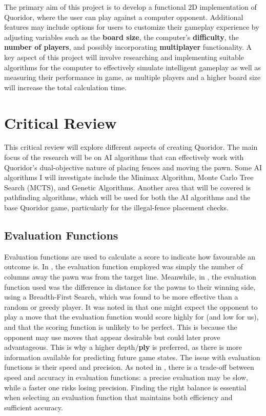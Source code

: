 \documentclass[review]{cmpreport}
\begin{document}
\noindent The primary aim of this project is to develop a functional 2D implementation of Quoridor, where the user can play against a computer opponent. Additional features may include options for users to customize their gameplay experience by adjusting variables such as the \textbf{board size}, the computer's \textbf{difficulty}, the \textbf{number of players}, and possibly incorporating \textbf{multiplayer} functionality. A key aspect of this project will involve researching and implementing suitable algorithms for the computer to effectively simulate intelligent gameplay as well as measuring their performance in game, as multiple players and a higher board size will increase the total calculation time.

\section{Critical Review}
This critical review will explore different aspects of creating Quoridor. The main focus of the research will be on AI algorithms that can effectively work with Quoridor's dual-objective nature of placing fences and moving the pawn. Some AI algorithms I will investigate include the Minimax Algorithm, Monte Carlo Tree Search (MCTS), and Genetic Algorithms. Another area that will be covered is pathfinding algorithms, which will be used for both the AI algorithms and the base Quoridor game, particularly for the illegal-fence placement checks.

\subsection{Evaluation Functions}
Evaluation functions are used to calculate a score to indicate how favourable an outcome is. In \cite{mertens2006quoridor}, the evaluation function employed was simply the number of columns away the pawn was from the target line. Meanwhile, in \cite{josequoridor}, the evaluation function used was the difference in distance for the pawns to their winning side, using a Breadth-First Search, which was found to be more effective than a random or greedy player. It was noted in \cite{strong2011minimax} that one might expect the opponent to play a move that the evaluation function would score highly for (and low for us), and that the scoring function is unlikely to be perfect. This is because the opponent may use moves that appear desirable but could later prove advantageous. This is why a higher depth/\textbf{ply} is preferred, as there is more information available for predicting future game states. The issue with evaluation functions is their speed and precision. As noted in \cite{brenner2015artificial}, there is a trade-off between speed and accuracy in evaluation functions: a precise evaluation may be slow, while a faster one risks losing precision. Finding the right balance is essential when selecting an evaluation function that maintains both efficiency and sufficient accuracy.
\end{document}

